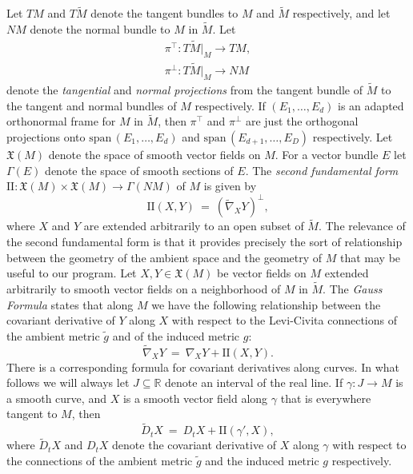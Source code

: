 \documentclass[11pt]{article}
\newcommand{\benn}{\begin{equation*}}
\newcommand{\eenn}{\end{equation*}}
\newcommand{\R}{\ensuremath{\mathbb{R}}}
\newcommand{\spn}{\mathrm{span} \,}
\numberwithin{equation}{section}
\begin{document}
Let $TM$ and $T\tilde{M}$ denote the tangent bundles to $M$ and $\tilde{M}$ respectively, and let $NM$ denote the normal bundle to $M$ in $\tilde{M}$. Let
\begin{align*}
	\pi^{\top}: T\tilde{M}|_M \to TM, \\
	\pi^{\perp}: T\tilde{M}|_M \to NM
\end{align*}
denote the \emph{tangential} and \emph{normal projections} from the tangent bundle of $\tilde{M}$ to the tangent and normal bundles of $M$ respectively. If $(E_1, \ldots, E_d)$ is an adapted orthonormal frame for $M$ in $\tilde{M}$, then $\pi^{\top}$ and $\pi^{\perp}$ are just the orthogonal projections onto $\spn(E_1, \ldots, E_d)$ and $\spn(E_{d+1}, \ldots, E_D)$ respectively. Let $\mathfrak{X}(M)$ denote the space of smooth vector fields on $M$. For a vector bundle $E$ let $\Gamma(E)$ denote the space of smooth sections of $E$. The \emph{second fundamental form} $\mathrm{II}: \mathfrak{X}(M) \times \mathfrak{X}(M) \to \Gamma(NM)$ of $M$ is given by
\benn
	\mathrm{II}(X, Y) \ = \ (\tilde{\nabla}_X Y)^{\perp},
\eenn
where $X$ and $Y$ are extended arbitrarily to an open subset of $\tilde{M}$. The relevance of the second fundamental form is that it provides precisely the sort of relationship between the geometry of the ambient space and the geometry of $M$ that may be useful to our program. Let $X, Y \in \mathfrak{X}(M)$ be vector fields on $M$ extended arbitrarily to smooth vector fields on a neighborhood of $M$ in $\tilde{M}$. The \emph{Gauss Formula} states that along $M$ we have the following relationship between the covariant derivative of $Y$ along $X$ with respect to the Levi-Civita connections of the ambient metric $\tilde{g}$ and of the induced metric $g$:
\benn
	\tilde{\nabla}_X Y \ = \ \nabla_X Y + \mathrm{II}(X, Y).
\eenn
There is a corresponding formula for covariant derivatives along curves. In what follows we will always let $J \subseteq \R$ denote an interval of the real line. If $\gamma: J \to M$ is a smooth curve, and $X$ is a smooth vector field along $\gamma$ that is everywhere tangent to $M$, then
\benn
	\tilde{D}_tX \ = \ D_tX + \mathrm{II}(\gamma', X),
\eenn
where $\tilde{D}_t X$ and $D_t X$ denote the covariant derivative of $X$ along $\gamma$ with respect to the connections of the ambient metric $\tilde{g}$ and the induced metric $g$ respectively.
\end{document}
